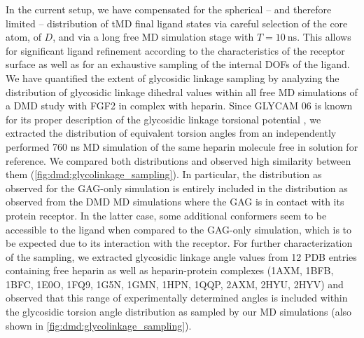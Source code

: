 In the current setup, we have compensated for the spherical – and therefore
limited – distribution of tMD final ligand states via careful selection of the
core atom, of $D$, and via a long free MD simulation stage with
$T=\SI{10}{\nano\second}$. This allows for significant ligand refinement
according to the characteristics of the receptor surface as well as for an
exhaustive sampling of the internal DOFs of the ligand. We have quantified the
extent of glycosidic linkage sampling by analyzing the distribution of
glycosidic linkage dihedral values within all free MD simulations of a DMD study
with FGF2 in complex with heparin. Since GLYCAM 06 is known for its proper
description of the glycosidic linkage torsional
potential \cite{kirschner_glycam06:_2008}, we extracted the distribution of
equivalent torsion angles from an independently performed 760 ns MD simulation
of the same heparin molecule free in solution for reference. We compared both
distributions and observed high similarity between them
(\cref{fig:dmd:glycolinkage_sampling}). In particular, the distribution as
observed for the GAG-only simulation is entirely included in the distribution as
observed from the DMD MD simulations where the GAG is in contact with its
protein receptor. In the latter case, some additional conformers seem to be
accessible to the ligand when compared to the GAG-only simulation, which is to
be expected due to its interaction with the receptor. For further
characterization of the sampling, we extracted glycosidic linkage angle values
from 12 PDB entries containing free heparin as well as heparin-protein complexes
(1AXM, 1BFB, 1BFC, 1E0O, 1FQ9, 1G5N, 1GMN, 1HPN, 1QQP, 2AXM, 2HYU, 2HYV) and
observed that this range of experimentally determined angles is included within
the glycosidic torsion angle distribution as sampled by our MD simulations (also
shown in \cref{fig:dmd:glycolinkage_sampling}).



